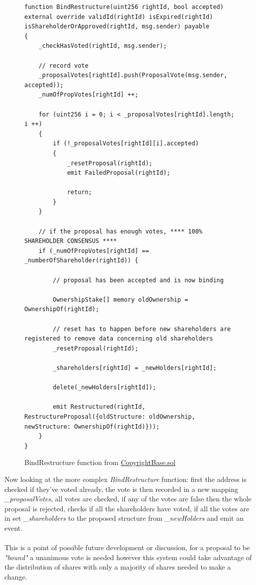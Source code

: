\documentclass[12pt]{article}
\newcommand{\br}[0]{\\~\\}
\begin{document}
\begin{figure}[H]
\caption{BindRestructure function from \href{https://github.com/MrHarrisonBarker/CRPL/blob/main/CRPL.Contracts/contracts/Copyrights/CopyrightBase.sol}{CopyrightBase.sol}}
\centering
\begin{lstlisting}[language=Solidity]
function BindRestructure(uint256 rightId, bool accepted) external override validId(rightId) isExpired(rightId) isShareholderOrApproved(rightId, msg.sender) payable 
{
	_checkHasVoted(rightId, msg.sender);
     
	// record vote
	_proposalVotes[rightId].push(ProposalVote(msg.sender, accepted));
	_numOfPropVotes[rightId] ++;

	for (uint256 i = 0; i < _proposalVotes[rightId].length; i ++) 
	{
		if (!_proposalVotes[rightId][i].accepted) 
		{
			_resetProposal(rightId);
			emit FailedProposal(rightId);

			return;
		}
	}

	// if the proposal has enough votes, **** 100% SHAREHOLDER CONSENSUS ****
	if (_numOfPropVotes[rightId] == _numberOfShareholder(rightId)) {
            
		// proposal has been accepted and is now binding

		OwnershipStake[] memory oldOwnership = OwnershipOf(rightId);
            
		// reset has to happen before new shareholders are registered to remove data concerning old shareholders
		_resetProposal(rightId);

		_shareholders[rightId] = _newHolders[rightId];

		delete(_newHolders[rightId]);

		emit Restructured(rightId, RestructureProposal({oldStructure: oldOwnership, newStructure: OwnershipOf(rightId)}));
	}
}	
\end{lstlisting}
\end{figure}

Now looking at the more complex \textit{BindRestructure} function: first the address is checked if they've voted already, the vote is then recorded in a new mapping \textit{\_proposalVotes}, all votes are checked, if any of the votes are false then the whole proposal is rejected, checks if all the shareholders have voted, if all the votes are in set \textit{\_shareholders} to the proposed structure from \textit{\_newHolders} and emit an event.
\br
This is a point of possible future development or discussion, for a proposal to be \textit{"bound"} a unanimous vote is needed however this system could take advantage of the distribution of shares with only a majority of shares needed to make a change.
\end{document}
